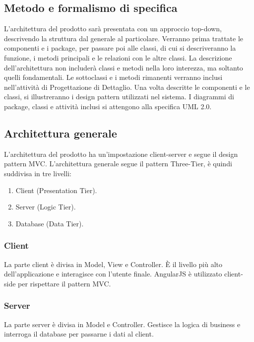 \documentclass[a4paper, titlepage]{article}
\begin{document}
	\subsection{Metodo e formalismo di specifica}
	
	L'architettura del prodotto sarà presentata con un approccio top-down, descrivendo la struttura dal generale al particolare. Verranno prima trattate le componenti e i package, per passare poi alle classi, di cui si descriveranno la funzione, i metodi principali e le relazioni con le altre classi. La descrizione dell'architettura non includerà classi e metodi nella loro interezza, ma soltanto quelli fondamentali. Le sottoclassi e i metodi rimanenti verranno inclusi nell'attività di Progettazione di Dettaglio.
	\newline
	Una volta descritte le componenti e le classi, si illustreranno i design pattern utilizzati nel sistema. 
	\newline
	I diagrammi di package, classi e attività inclusi si attengono alla specifica UML 2.0.
	
	\subsection{Architettura generale}
	L'architettura del prodotto ha un'impostazione client-server e segue il design pattern MVC. 
	\newline
	L'architettura generale segue il pattern Three-Tier, è quindi suddivisa in tre livelli:
	\begin{enumerate}
		\item Client (Presentation Tier).
		\item Server (Logic Tier).
		\item Database (Data Tier).
	\end{enumerate}
	
	\subsubsection{Client}
	La parte client è divisa in Model, View e Controller. È il livello più alto dell'applicazione e interagisce con l'utente finale.
	\newline
	AngularJS è utilizzato client-side per rispettare il pattern MVC.
	
	\subsubsection{Server}
	La parte server è divisa in Model e Controller. Gestisce la logica di business e interroga il database per passarne i dati al client.
	
\end{document}
